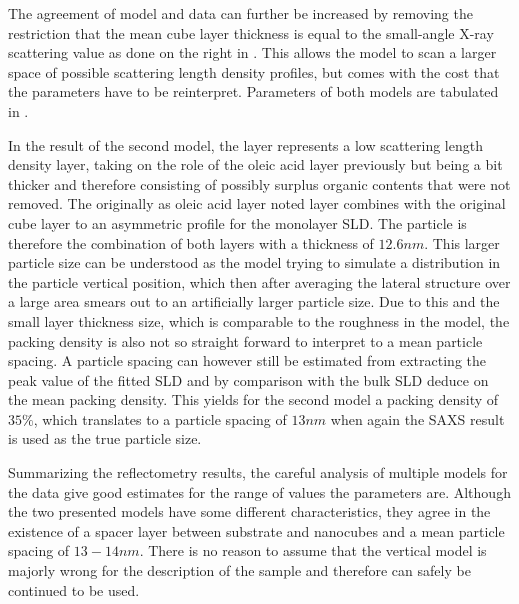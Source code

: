 \documentclass[\main/dresen_thesis.tex]{subfiles}
\begin{document}
  The agreement of model and data can further be increased by removing the restriction that the mean cube layer thickness is equal to the small-angle X-ray scattering value as done on the right in .
  This allows the model to scan a larger space of possible scattering length density profiles, but comes with the cost that the parameters have to be reinterpret.
  Parameters of both models are tabulated in .

  In the result of the second model, the  layer represents a low scattering length density layer, taking on the role of the oleic acid layer previously but being a bit thicker and therefore consisting of possibly surplus organic contents that were not removed.
  The originally as oleic acid layer noted layer combines with the original cube layer to an asymmetric profile for the monolayer SLD.
  The particle is therefore the combination of both layers with a thickness of $12.6 \unit{nm}$.
  This larger particle size can be understood as the model trying to simulate a distribution in the particle vertical position, which then after averaging the lateral structure over a large area smears out to an artificially larger particle size.
  Due to this and the small layer thickness size, which is comparable to the roughness in the model, the packing density is also not so straight forward to interpret to a mean particle spacing.
  A particle spacing can however still be estimated from extracting the peak value of the fitted SLD and by comparison with the bulk SLD deduce on the mean packing density.
  This yields for the second model a packing density of $35 \%$, which translates to a particle spacing of $13 \unit{nm}$ when again the SAXS result is used as the true particle size.

  Summarizing the reflectometry results, the careful analysis of multiple models for the data give good estimates for the range of values the parameters are.
  Although the two presented models have some different characteristics, they agree in the existence of a spacer layer between substrate and nanocubes and a mean particle spacing of $13 - 14 \unit{nm}$.
  There is no reason to assume that the vertical model is majorly wrong for the description of the sample and therefore can safely be continued to be used.
\end{document}
